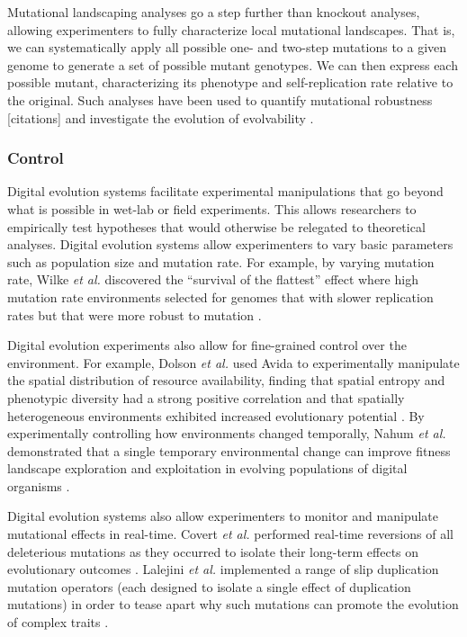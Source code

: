 Mutational landscaping analyses go a step further than knockout analyses, allowing experimenters to fully characterize local mutational landscapes.
That is, we can systematically apply all possible one- and two-step mutations to a given genome to generate a set of possible mutant genotypes. 
We can then express each possible mutant, characterizing its phenotype and self-replication rate relative to the original.
Such analyses have been used to quantify mutational robustness [citations] and investigate the evolution of evolvability \citep{canino-koning_fluctuating_2019}. 

\subsubsection{Control}

Digital evolution systems facilitate experimental manipulations that go beyond what is possible in wet-lab or field experiments.
This allows researchers to empirically test hypotheses that would otherwise be relegated to theoretical analyses.
Digital evolution systems allow experimenters to vary basic parameters such as population size and mutation rate.
For example, by varying mutation rate, Wilke \textit{et al.} discovered the ``survival of the flattest'' effect where high mutation rate environments selected for genomes that with slower replication rates but that were more robust to mutation \citep{wilke_flattest_2001}. 

Digital evolution experiments also allow for fine-grained control over the environment.
For example, Dolson \textit{et al.} used Avida to experimentally manipulate the spatial distribution of resource availability, finding that spatial entropy and phenotypic diversity had a strong positive correlation and that spatially heterogeneous environments exhibited increased evolutionary potential \citep{dolson_spatial_2017}.
By experimentally controlling how environments changed temporally, Nahum \textit{et al.} demonstrated that a single temporary environmental change can improve fitness landscape exploration and exploitation in evolving populations of digital organisms \citep{nahum_improved_2017}.

Digital evolution systems also allow experimenters to monitor and manipulate mutational effects in real-time.
Covert \textit{et al.} performed real-time reversions of all deleterious mutations as they occurred to isolate their long-term effects on evolutionary outcomes \citep{covert_experiments_2013}.
Lalejini \textit{et al.} implemented a range of slip duplication mutation operators (each designed to isolate a single effect of duplication mutations) in order to tease apart why such mutations can promote the evolution of complex traits \citep{lalejini_gene_2017}.

